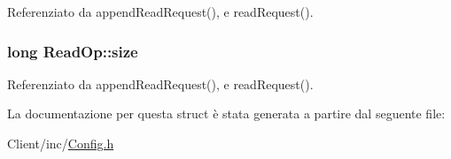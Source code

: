 Referenziato da append\+Read\+Request(), e read\+Request().

\subsubsection[{\texorpdfstring{size}{size}}]{\setlength{\rightskip}{0pt plus 5cm}long Read\+Op\+::size}\hypertarget{structReadOp_a2562187098302a2641f29f89e77748b0}{}\label{structReadOp_a2562187098302a2641f29f89e77748b0}


Referenziato da append\+Read\+Request(), e read\+Request().



La documentazione per questa struct è stata generata a partire dal seguente file\+:\begin{DoxyCompactItemize}
\item 
Client/inc/\hyperlink{Client_2inc_2Config_8h}{Config.\+h}\end{DoxyCompactItemize}
